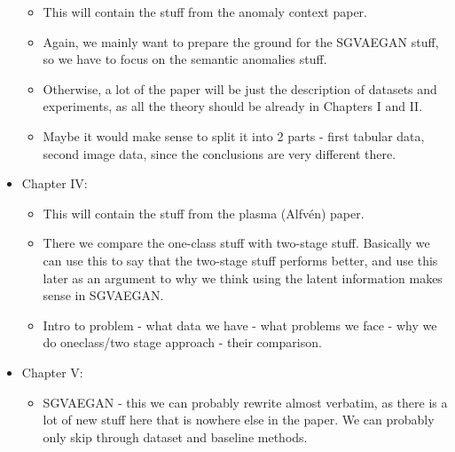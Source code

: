 \documentclass[twoside, a4paper, 12pt]{book}
\begin{document}
\begin{itemize}
		\begin{itemize}
			\item This will contain the stuff from the anomaly context paper.
			\item Again, we mainly want to prepare the ground for the SGVAEGAN stuff, so we have to focus on the semantic anomalies stuff.
			\item Otherwise, a lot of the paper will be just the description of datasets and experiments, as all the theory should be already in Chapters I and II.
			\item Maybe it would make sense to split it into 2 parts - first tabular data, second image data, since the conclusions are very different there.
		\end{itemize}
	\item Chapter IV: 
		\begin{itemize}
			\item This will contain the stuff from the plasma (Alfvén) paper.
			\item There we compare the one-class stuff with two-stage stuff. Basically we can use this to say that the two-stage stuff performs better, and use this later as an argument to why we think using the latent information makes sense in SGVAEGAN.
			\item Intro to problem - what data we have - what problems we face - why we do oneclass/two stage approach - their comparison.
		\end{itemize}
	\item Chapter V: 
		\begin{itemize}
			\item SGVAEGAN - this we can probably rewrite almost verbatim, as there is a lot of new stuff here that is nowhere else in the paper. We can probably only skip through dataset and baseline methods.
		\end{itemize}

\end{itemize}

\begin{theorem}
    \lipsum[5]
\end{theorem}

\begin{example}
    \lipsum[5]
\end{example}







\end{document}
